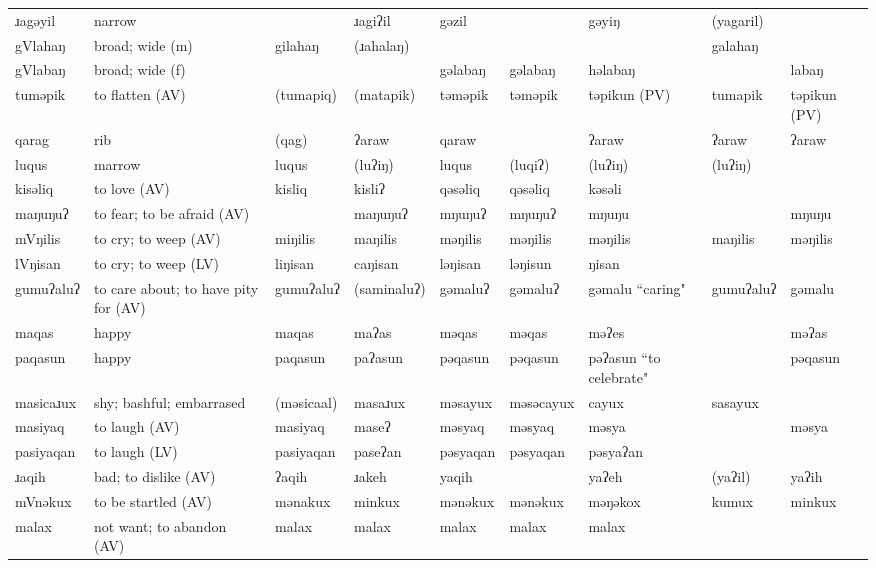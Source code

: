 \begin{landscape}
\begin{longtable}{*{9}{>{\raggedright\arraybackslash}p{}}}
\text{*}ɹagəyil & narrow &  & ɹagiʔil & gəzil &  & gəyiŋ & (yagaril) & \\
\text{*}gVlahaŋ & broad; wide (m) & gilahaŋ & (ɹahalaŋ) &  &  &  & galahaŋ & \\
\text{*}gVlabaŋ & broad; wide (f) &  &  & gəlabaŋ & gəlabaŋ & həlabaŋ &  & labaŋ\\
\text{*}tuməpik & to flatten (AV) & (tumapiq) & (matapik) & təməpik & təməpik & təpikun (PV) & tumapik & təpikun (PV)\\
\text{*}qarag & rib & (qag) & ʔaraw & qaraw &  & ʔaraw & ʔaraw & ʔaraw\\
\text{*}luqus & marrow & luqus & (luʔiŋ) & luqus & (luqiʔ) & (luʔiŋ) & (luʔiŋ) & \\
\text{*}kisəliq & to love (AV) & kisliq & kisliʔ & qəsəliq & qəsəliq & kəsəli &  & \\
\text{*}maŋuŋuʔ & to fear; to be afraid (AV) &  & maŋuŋuʔ & mŋuŋuʔ & mŋuŋuʔ & mŋuŋu &  & mŋuŋu\\
\text{*}mVŋilis & to cry; to weep (AV) & miŋilis & maŋilis & məŋilis & məŋilis & məŋilis & maŋilis & məŋilis\\
\text{*}lVŋisan & to cry; to weep (LV) & liŋisan & caŋisan & ləŋisan & ləŋisun & ŋisan &  & \\
\text{*}gumuʔaluʔ & to care about; to have pity for (AV) & gumuʔaluʔ & (saminaluʔ) & gəmaluʔ & gəmaluʔ & gəmalu \newline ``caring" & gumuʔaluʔ & gəmalu\\
\text{*}maqas & happy & maqas & maʔas & məqas & məqas & məʔes &  & məʔas\\
\text{*}paqasun & happy & paqasun & paʔasun & pəqasun & pəqasun & pəʔasun \newline ``to celebrate" &  & pəqasun\\
\text{*}masicaɹux & shy; bashful; embarrased & (məsicaal) & masaɹux & məsayux & məsəcayux & cayux & sasayux & \\
\text{*}masiyaq & to laugh (AV) & masiyaq & maseʔ & məsyaq & məsyaq & məsya &  & məsya\\
\text{*}pasiyaqan & to laugh (LV) & pasiyaqan & paseʔan & pəsyaqan & pəsyaqan & pəsyaʔan &  & \\
\text{*}ɹaqih & bad; to dislike (AV) & ʔaqih & ɹakeh & yaqih &  & yaʔeh & (yaʔil) & yaʔih\\
\text{*}mVnəkux & to be startled (AV) & mənakux & minkux & mənəkux & mənəkux & məŋəkox & kumux & minkux\\
\text{*}malax & not want; to abandon (AV) & malax & malax & malax & malax & malax &  & \\

\end{longtable}
\end{landscape}
